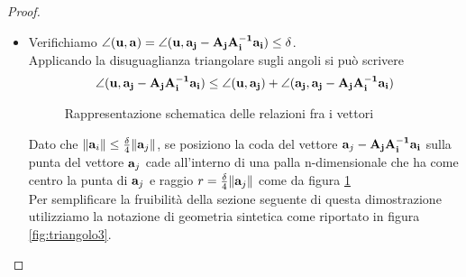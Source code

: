 \documentclass[a4paper]{book}
\begin{document}
\begin{proof}
\begin{itemize}
\item Verifichiamo $ \angle (\vb{u, a})  = \angle (\vb{u} , \vb{a_j - A_j A_i^{-1} a_i} ) \leq \delta $. \\Applicando la disuguaglianza triangolare sugli angoli si può scrivere
\begin{equation}
\label{eq:angle}
\angle ( \vb{u} , \vb{a_j - A_j A_i^{-1} a_i} ) \leq \angle (\vb{u} , \vb{a_j}) + \angle(\vb{a_j}, \vb{a_j- A_j A_i^{-1} a_i} ) 
\end{equation}
\begin{figure}[!h]
\centering
{}
\caption{Rappresentazione schematica delle relazioni fra i vettori}
\label{fig:palla}
\end{figure} 

Dato che $ \norm{\vb{a}_i} \leq \frac{\delta}{4}\norm{\vb{a}_j}$, se posiziono la coda del vettore $\vb{a}_j - \vb{A_j A_i^{-1} a_i}$ sulla punta del vettore $\vb{a}_j$ cade all'interno di una palla n-dimensionale che ha come centro la punta di $\vb{a}_j$ e raggio $r = \frac{\delta}{4}\norm{\vb{a}_j}$ come da figura \ref{fig:palla} \\
\newpage
Per semplificare la fruibilità della sezione seguente di questa dimostrazione utilizziamo la notazione di geometria sintetica come riportato in figura \ref{fig:triangolo3}.


\end{itemize}
\end{proof}
\end{document}
